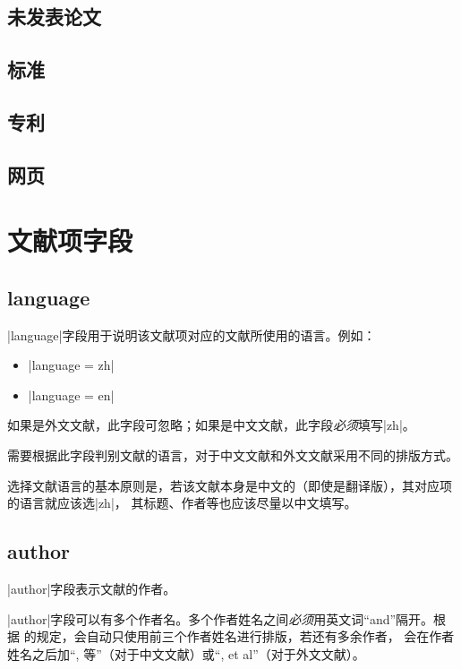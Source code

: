 \subsection{未发表论文}

\subsection{标准}

\subsection{专利}

\subsection{网页}


\section{文献项字段}\label{sec:bib-field}

\subsection{language}\label{subsec:language}

|language|字段用于说明该文献项对应的文献所使用的语言。例如：
\begin{itemize}
\item |language = {zh}|
\item |language = {en}|
\end{itemize}

如果是外文文献，此字段可忽略；如果是中文文献，此字段\emph{必须}填写|zh|。

{\BibTeX}需要根据此字段判别文献的语言，对于中文文献和外文文献采用不同的排版方式。

选择文献语言的基本原则是，若该文献本身是中文的（即使是翻译版），其对应项的语言就应该选|zh|，
其标题、作者等也应该尽量以中文填写。

\subsection{author}\label{subsec:author}

|author|字段表示文献的作者。

|author|字段可以有多个作者名。多个作者姓名之间\emph{必须}用英文词``and''隔开。根据
\cite{gbt7714-2005}的规定，{\BibTeX}会自动只使用前三个作者姓名进行排版，若还有多余作者，
会在作者姓名之后加``, 等''（对于中文文献）或``, et al''（对于外文文献）。

